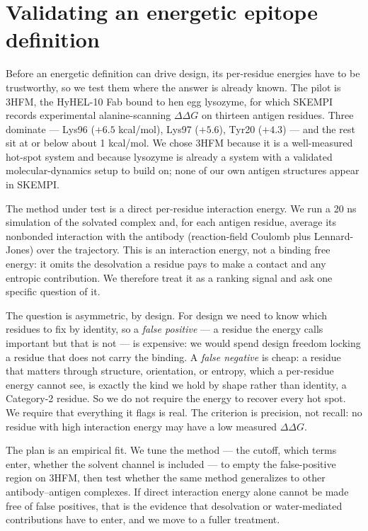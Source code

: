 \section{Validating an energetic epitope definition}\label{sec:energetic}

Before an energetic definition can drive design, its per-residue energies have to be trustworthy, so
we test them where the answer is already known. The pilot is 3HFM, the HyHEL-10 Fab bound to hen egg
lysozyme, for which SKEMPI records experimental alanine-scanning $\Delta\Delta G$ on thirteen antigen
residues. Three dominate --- Lys96 ($+6.5$ kcal/mol), Lys97 ($+5.6$), Tyr20 ($+4.3$) --- and the rest
sit at or below about 1 kcal/mol. We chose 3HFM because it is a well-measured hot-spot system and
because lysozyme is already a system with a validated molecular-dynamics setup to build on; none of
our own antigen structures appear in SKEMPI.

The method under test is a direct per-residue interaction energy. We run a 20 ns simulation of the
solvated complex and, for each antigen residue, average its nonbonded interaction with the antibody
(reaction-field Coulomb plus Lennard-Jones) over the trajectory. This is an interaction energy, not a
binding free energy: it omits the desolvation a residue pays to make a contact and any entropic
contribution. We therefore treat it as a ranking signal and ask one specific question of it.

The question is asymmetric, by design. For design we need to know which residues to fix by identity,
so a \emph{false positive} --- a residue the energy calls important but that is not --- is expensive:
we would spend design freedom locking a residue that does not carry the binding. A \emph{false
negative} is cheap: a residue that matters through structure, orientation, or entropy, which a
per-residue energy cannot see, is exactly the kind we hold by shape rather than identity, a
Category-2 residue. So we do not require the energy to recover every hot spot. We require that
everything it flags is real. The criterion is precision, not recall: no residue with high interaction
energy may have a low measured $\Delta\Delta G$.

The plan is an empirical fit. We tune the method --- the cutoff, which terms enter, whether the
solvent channel is included --- to empty the false-positive region on 3HFM, then test whether the same
method generalizes to other antibody--antigen complexes. If direct interaction energy alone cannot be
made free of false positives, that is the evidence that desolvation or water-mediated contributions
have to enter, and we move to a fuller treatment.

